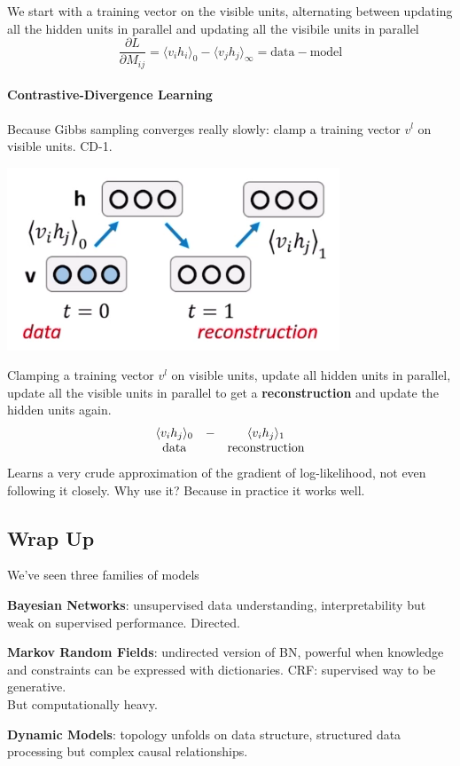 \documentclass[10pt]{report}
\begin{document}
We start with a training vector on the visible units, alternating between updating all the hidden units in parallel and updating all the visibile units in parallel
$$\frac{\partial L}{\partial M_{ij}} = \langle v_ih_i\rangle_0 - \langle v_jh_j\rangle_\infty = \text{data} - \text{model}$$
\paragraph{Contrastive-Divergence Learning} Because Gibbs sampling converges really slowly: clamp a training vector $v^l$ on visible units. CD-1.
\begin{center}
	\includegraphics[scale=0.5]{49.png}
\end{center}
Clamping a training vector $v^l$ on visible units, update all hidden units in parallel, update all the visible units in parallel to get a \textbf{reconstruction} and update the hidden units again.
$$\begin{array}{c c c}
\langle v_ih_j\rangle_0&-&\langle v_ih_j\rangle_1\\
\text{data}& &\text{reconstruction}
\end{array}$$
Learns a very crude approximation of the gradient of log-likelihood, not even following it closely. Why use it? Because in practice it works well.

\subsection{Wrap Up}
We've seen three families of models\begin{list}{}{}
	\item \textbf{Bayesian Networks}: unsupervised data understanding, interpretability but weak on supervised performance. Directed.
	\item \textbf{Markov Random Fields}: undirected version of BN, powerful when knowledge and constraints can be expressed with dictionaries. CRF: supervised way to be generative.\\
	But computationally heavy.
	\item \textbf{Dynamic Models}: topology unfolds on data structure, structured data processing but complex causal relationships.
\end{list}
\end{document}

